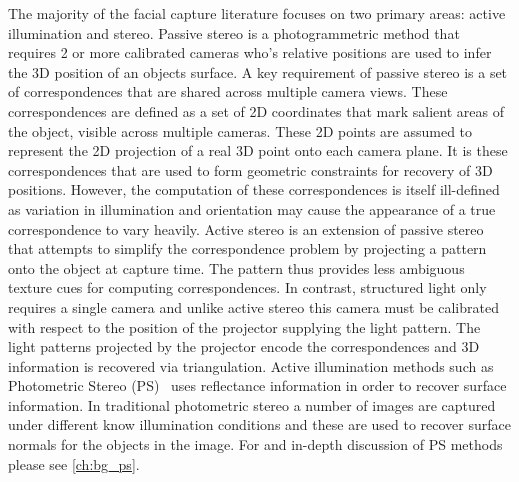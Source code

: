 The majority of the facial capture literature focuses on two primary areas:
active illumination and
stereo. Passive stereo is a photogrammetric method that requires 2 or more
calibrated cameras who's relative positions are used to infer the 3D position of
an objects surface. A key requirement of passive stereo is a set of
correspondences that are shared across multiple camera views. These
correspondences are defined as a set of 2D coordinates that mark salient areas
of the object, visible across multiple cameras. These 2D points are assumed to
represent the 2D projection of a real 3D point onto each camera plane. It is
these correspondences that are used to form geometric constraints for recovery
of 3D positions. However, the computation of these correspondences is itself
ill-defined as variation in illumination and orientation may cause the
appearance of a true correspondence to vary heavily. Active stereo is an
extension of passive stereo that attempts to simplify the correspondence problem
by projecting a pattern onto the object at capture time. The pattern thus
provides less ambiguous texture cues for computing correspondences. In contrast,
structured light only requires a single camera and unlike active stereo this
camera must be calibrated with respect to the position of the projector
supplying the light pattern. The light patterns projected by the projector
encode the correspondences and 3D information is recovered via triangulation.
Active illumination methods such as
Photometric Stereo (PS)~\cite{woodham1980photometric} uses reflectance
information in order to recover surface information. In traditional photometric
stereo a number of images are captured under different know illumination
conditions and these are used to recover surface normals for the objects in the
image. For and in-depth discussion of PS methods please see
\cref{ch:bg_ps}.

